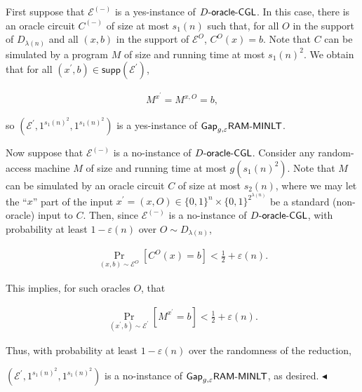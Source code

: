 \documentclass[10pt,a4paper]{article}
\begin{document}
First suppose that $\mathcal{E}^{(-)}$ is a yes-instance of $D\text{-}{\sf oracle}\text{-}{\sf CGL}$. In this case, there is an oracle circuit $C^{(-)}$ of size at most $s_{1}(n)$ such that, for all $O$ in the support of $D_{\lambda(n)}$ and all $(x,b)$ in the support of $\mathcal{E}^{O}$, $C^{O}(x)=b$. Note that $C$ can be simulated by a program $M$ of size and running time at most $s_{1}(n)^{2}$. We obtain that for all $(x^{\prime},b)\in{\mathsf{supp}}(\mathcal{E}^{\prime})$,\par


\[\begin{gathered}
M^{x^{\prime}}=M^{x,O}=b,
\end{gathered}\]


so $(\mathcal{E}^{\prime},1^{s_{1}(n)^{2}},1^{s_{1}(n)^{2}})$ is a yes-instance of ${\sf Gap}_{g,\varepsilon}{\sf RAM}\text{-}{\sf MINLT}$.\par




Now suppose that $\mathcal{E}^{(-)}$ is a no-instance of $D\text{-}{\sf oracle}\text{-}{\sf CGL}$. Consider any random-access machine $M$ of size and running time at most $g(s_{1}(n)^{2})$. Note that $M$ can be simulated by an oracle circuit $C$ of size at most $s_{2}(n)$, where we may let the “$x$” part of the input $x^{\prime}=(x,O)\in\{0,1\}^{n}\times\{0,1\}^{2^{\lambda(n)}}$ be a standard (non-oracle) input to $C$. Then, since $\mathcal{E}^{(-)}$ is a no-instance of $D\text{-}{\sf oracle}\text{-}{\sf CGL}$, with probability at least $1-\varepsilon(n)$ over $O\sim D_{\lambda(n)}$,\par


\[\begin{gathered}
\Pr_{(x,b)\sim\mathcal{E}^{O}}\left[C^{O}(x)=b\right]<\frac{1}{2}+\varepsilon(n).
\end{gathered}\]


This implies, for such oracles $O$, that\par


\[\begin{gathered}
\Pr_{(x^{\prime},b)\sim\mathcal{E}^{\prime}}\left[M^{x^{\prime}}=b\right]<\frac{1}{2}+\varepsilon(n).
\end{gathered}\]


Thus, with probability at least $1-\varepsilon(n)$ over the randomness of the reduction,


$(\mathcal{E}^{\prime},1^{s_{1}(n)^{2}},1^{s_{1}(n)^{2}})$ is a no-instance of ${\sf Gap}_{g,\varepsilon}{\sf RAM}\text{-}{\sf MINLT}$, as desired.
$\blacktriangleleft$\par
\end{document}
